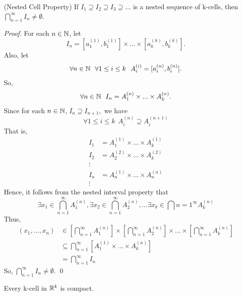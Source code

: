 \documentclass[a4paper]{article}
\begin{document}
	\begin{theorem} (Nested Cell Property)
		If $I_1 \supseteq I_2 \supseteq I_3 \supseteq ...$ is a nested sequence of k-cells, then $\bigcap \limits_{n=1}^\infty I_n \not = \emptyset$.
	\end{theorem}
	\begin{proof}
		For each $n\in \mathbb{N}$, let
		$$I_n = [a_1 ^{(1)}, b_1 ^{(1)}] \times ... \times [a_k ^{(k)}, b_k ^{(k)}].$$
		Also, let
		$$ \forall n \in \mathbb{N} ~~\forall 1 \leq i \leq k ~~A_i ^{(i)} = [a_i ^{(n)}, b_i^{(n)}].$$
		So, 
		$$ \forall n \in \mathbb{N} ~~I_n = A_1^{(n)} \times ... \times A_k ^{(n)}.$$
		Since for each $n \in \mathbb{N}$, $I_n \supseteq I_{n+1},$ we have
		$$\forall 1 \leq i \leq k ~~ A_i ^{(n)} \supseteq A_i^{(n+1)}$$
		That is,
		\begin{align*}
			I_1 &= A_1^{(1)} \times ... \times A_k ^{(1)} \\
			I_2 &= A_2 ^{(2)} \times ... \times A_k^{(2)} \\
			\vdots \\
			I_n &= A_n^{(1)} \times ... \times A_n^{(n)} \\
			\vdots
		\end{align*}
		Hence, it follows from the nested interval property that
		$$\exists x_1 \in \bigcap \limits_{n=1}^\infty A_1^{(n)}, \exists x_2 \in \bigcap \limits_{n=1}^\infty A_2^{(n)}, ... \exists x_k \in \bigcap \limits{n=1}^{\infty} A_k ^{(n)}$$
		Thus,
		\begin{align*}
			(x_1,...,x_n) &\in \left[\bigcap \limits_{n=1}^\infty A_1^{(n)}\right] \times \left[\bigcap \limits_{n=1}^\infty A_2^{(n)}\right] \times... \times \left[\bigcap \limits_{n=1}^\infty A_k^{(n)}\right] \\
			&\subseteq \bigcap \limits_{n=1}^\infty \left[A_1^{(1)} \times ... \times A_k^{(n)}\right] \\
			&= \bigcap \limits_{n=1}^\infty I_n
		\end{align*}
		So, $\bigcap \limits_{n=1}^\infty I_n \not = \emptyset.$ \qed
	\end{proof}
	
	\begin{theorem}
		Every k-cell in $\mathbb{R} ^k$ is compact.
	\end{theorem}
\end{document}
